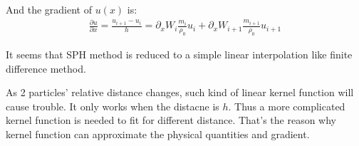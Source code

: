 And the gradient of $u(x)$ is:
\begin{equation}
    \begin{aligned}
        \frac{\partial u}{\partial x} = \frac{u_{i+1}-u_i}{h}
        =
        \partial_x W_i\frac{m_i}{\rho_0} u_i + \partial_x W_{i+1}\frac{m_{i+1}}{\rho_0} u_{i+1}
    \end{aligned}
\end{equation}

It seems that SPH method is reduced to a simple linear interpolation like finite difference method.

As 2 particles' relative distance changes, 
such kind of linear kernel function will cause trouble. 
It only works when the distacne is $h$. 
Thus
a more complicated kernel function is needed to fit for different distance.
That's the reason why kernel function can approximate the physical quantities and gradient.